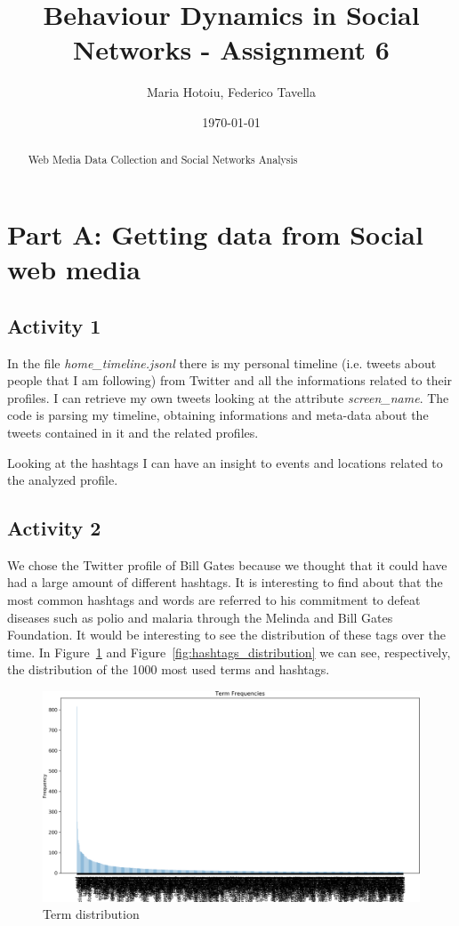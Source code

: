 \documentclass[a4paper]{article}
\title{Behaviour Dynamics in Social Networks - Assignment 6}
\author{Maria Hotoiu, Federico Tavella}
\date{\today}
\begin{document}
\maketitle

\begin{abstract}
Web Media Data Collection and Social Networks Analysis
\end{abstract}

\section{Part A: Getting data from Social web media}

\subsection{Activity 1}

In the file \emph{home\_timeline.jsonl} there is my personal timeline (i.e. tweets about people that I am following) from Twitter and all the informations related to their profiles. I can retrieve my own tweets looking at the attribute \emph{screen\_name}. The code is parsing my timeline, obtaining informations and meta-data about the tweets contained in it and the related profiles.

Looking at the hashtags I can have an insight to events and locations related to the analyzed profile.

\subsection{Activity 2}

We chose the Twitter profile of Bill Gates because we thought that it could have had a large amount of different hashtags. It is interesting to find about that the  most common hashtags and words are referred to his commitment to defeat diseases such as polio and malaria through the Melinda and Bill Gates Foundation. It would be interesting to see the distribution of these tags over the time. In Figure~\ref{fig:term_distribution} and Figure~\ref{fig:hashtags_distribution} we can see, respectively, the distribution of the 1000 most used terms and hashtags.

\begin{figure}[!hbtp]
\centering
\includegraphics[width=\textwidth]{res/img/term_distribution}
\caption{Term distribution}
\label{fig:term_distribution}
\end{figure}
\end{document}
